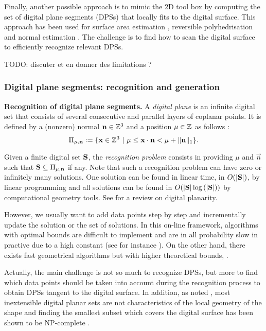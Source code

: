Finally, another possible approach is to mimic the 2D tool box by computing the set of
digital plane segments (DPSs) that locally fits to the digital surface. This approach
has been used for surface area estimation \cite{Klette2001}, reversible polyhedrisation
\cite{Sivignon2004} and normal estimation \cite{Charrier2011}.
The challenge is to find how to scan the digital surface to efficiently recognize relevant DPSs. 

TODO: discuter \cite{Charrier2011} et en donner des limitations ?

\subsubsection{Digital plane segments: recognition and generation}
\label{sec:dps}

\noindent\textbf{Recognition of digital plane segments.}
A \emph{digital plane} is an infinite digital set that 
consists of several consecutive and parallel layers of coplanar points. 
It is defined by a (nonzero) normal $\mathbf{n} \in {\ensuremath\mathbb{Z}}^3$ and a position $\mu \in {\ensuremath\mathbb{Z}}$ as follows
\cite{reveilles1991}:  
\begin{equation}
  \label{eq:plane}
\Pi_{\mu,\mathbf{n}} := \{ \mathbf{x} \in {\ensuremath\mathbb{Z}}^3 \ | \ \mu \leq \mathbf{x} \cdot \mathbf{n} < \mu + \|\mathbf{n}\|_1 \}.
\end{equation}

Given a finite digital set $\mathbf{S}$, the \emph{recognition problem} consists in providing
$\mu$ and $\vec{n}$ such that $\mathbf{S} \subseteq \Pi_{\mu,\mathbf{n}}$ if any.
Note that such a recognition problem can have zero or infinitely many solutions.
One solution can be found in linear time, \ie in $O(|\mathbf{S}|)$, by linear programming
and all solutions can be found in $O(|\mathbf{S}|\log{(|\ensuremath{\mathbf{S}}|)})$ by computational geometry tools.
See \cite{Brimkov2007} for a review on digital planarity.

However, we usually want to add data points step by step and incrementally update the solution
or the set of solutions. In this on-line framework, algorithms with optimal bounds are difficult
to implement and are in all probability slow in practive due to a high constant (see for instance
\cite{Buzer2003}).
On the other hand, there exists fast geometrical algorithms but with higher theoretical bounds,
\eg \cite{Gerard2005, Charrier2008, Veelaert2012}.

Actually, the main challenge is not so much to recognize DPSs, but more to find which data points
should be taken into account during the recognition process to obtain DPSs tangent to the digital
surface. In addition, as noted \cite{Charrier2011}, most inextensible digital planar sets are not
characteristics of the local geometry of the shape and finding the smallest subset which covers
the digital surface has been shown to be NP-complete \cite{Sivignon2009}.


